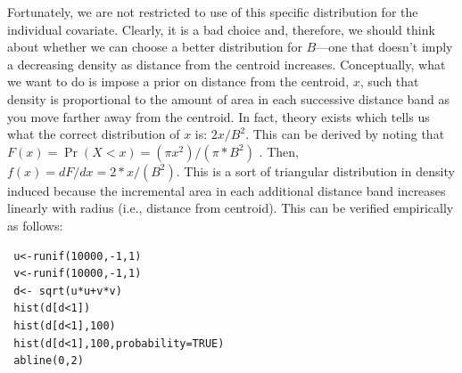 Fortunately, we are not 
restricted to use of this specific distribution for the individual
covariate. Clearly, it is a bad choice and, therefore, we should think
about whether we can choose a better distribution for $B$---one that
doesn't imply a decreasing density as distance from the centroid
increases.  Conceptually, what we want to do is impose a prior on
distance from the centroid, $x$, such that density is proportional to
the amount of area in each successive distance band as you move
farther away from the centroid.  In fact, theory exists which tells us
what the correct distribution of $x$ is: $2x/B^2$. This can be derived
by noting that $F(x) = \Pr(X<x) = (\pi x^2)/(\pi*B^{2})$ . Then, $f(x)
= dF/dx = 2*x/(B^{2})$. This is a sort of triangular distribution in
density induced because the incremental area in each additional
distance band increases linearly with radius (i.e., distance from
centroid). This can be verified empirically as follows:
{\small
\begin{verbatim}
 u<-runif(10000,-1,1)
 v<-runif(10000,-1,1)
 d<- sqrt(u*u+v*v)
 hist(d[d<1])
 hist(d[d<1],100)
 hist(d[d<1],100,probability=TRUE)
 abline(0,2)
\end{verbatim}
}


